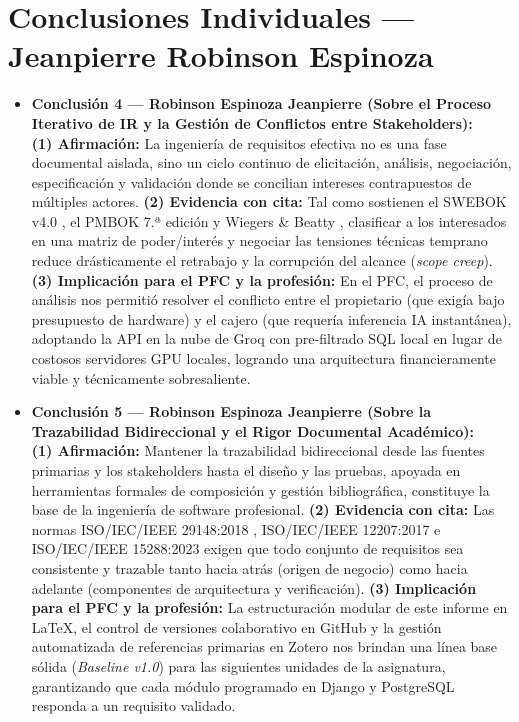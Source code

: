 \section*{Conclusiones Individuales --- Jeanpierre Robinson Espinoza}
\begin{itemize}
\item \textbf{Conclusión 4 --- Robinson Espinoza Jeanpierre (Sobre el Proceso Iterativo de IR y la Gestión de Conflictos entre Stakeholders):} \\
    \textbf{(1) Afirmación:} La ingeniería de requisitos efectiva no es una fase documental aislada, sino un ciclo continuo de elicitación, análisis, negociación, especificación y validación donde se concilian intereses contrapuestos de múltiples actores. \textbf{(2) Evidencia con cita:} Tal como sostienen el SWEBOK v4.0 \cite{swebok2024}, el PMBOK 7.ª edición \cite{pmbok} y Wiegers \& Beatty \cite{wiegers2013}, clasificar a los interesados en una matriz de poder/interés y negociar las tensiones técnicas temprano reduce drásticamente el retrabajo y la corrupción del alcance (\textit{scope creep}). \textbf{(3) Implicación para el PFC y la profesión:} En el PFC, el proceso de análisis nos permitió resolver el conflicto entre el propietario (que exigía bajo presupuesto de hardware) y el cajero (que requería inferencia IA instantánea), adoptando la API en la nube de Groq con pre-filtrado SQL local en lugar de costosos servidores GPU locales, logrando una arquitectura financieramente viable y técnicamente sobresaliente.

    \item \textbf{Conclusión 5 --- Robinson Espinoza Jeanpierre (Sobre la Trazabilidad Bidireccional y el Rigor Documental Académico):} \\
    \textbf{(1) Afirmación:} Mantener la trazabilidad bidireccional desde las fuentes primarias y los stakeholders hasta el diseño y las pruebas, apoyada en herramientas formales de composición y gestión bibliográfica, constituye la base de la ingeniería de software profesional. \textbf{(2) Evidencia con cita:} Las normas ISO/IEC/IEEE 29148:2018 \cite{ieee29148}, ISO/IEC/IEEE 12207:2017 \cite{ieee12207} e ISO/IEC/IEEE 15288:2023 \cite{ieee15288} exigen que todo conjunto de requisitos sea consistente y trazable tanto hacia atrás (origen de negocio) como hacia adelante (componentes de arquitectura y verificación). \textbf{(3) Implicación para el PFC y la profesión:} La estructuración modular de este informe en \LaTeX{}, el control de versiones colaborativo en GitHub y la gestión automatizada de referencias primarias en Zotero nos brindan una línea base sólida (\textit{Baseline v1.0}) para las siguientes unidades de la asignatura, garantizando que cada módulo programado en Django y PostgreSQL responda a un requisito validado.
\end{itemize}

